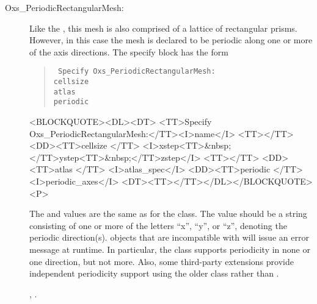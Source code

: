\begin{description}
\item[Oxs\_PeriodicRectangularMesh:]
\label{HTMLoxsperiodicrectangularmesh}%
%
Like the , this mesh is also comprised of a
lattice of rectangular prisms.  However, in this case the
mesh is declared to be periodic along one or more of the axis
directions.  The specify block has the form
\begin{latexonly}
\begin{quote}\tt
Specify Oxs\_PeriodicRectangularMesh: \ocb \\
\bi cellsize \ocb{}\ccb\\
\bi atlas \\
\bi periodic \\
\ccb
\end{quote}
\end{latexonly}
\begin{rawhtml}
<BLOCKQUOTE><DL><DT>
<TT>Specify Oxs_PeriodicRectangularMesh:</TT><I>name</I> <TT>{</TT>
<DD><TT>cellsize {</TT>
  <I>xstep<TT>&nbsp;</TT>ystep<TT>&nbsp;</TT>zstep</I>
  <TT>}</TT>
<DD><TT>atlas </TT> <I>atlas_spec</I>
<DD><TT>periodic </TT> <I>periodic_axes</I>
<DT><TT>}</TT></DL></BLOCKQUOTE><P>
\end{rawhtml}
The  and  values are the same as
for the  class.  The 
value should be a string consisting of one or more of the letters
``x'', ``y'', or ``z'', denoting the periodic direction(s).
 objects that are incompatible with
 will issue an error message at
runtime.  In particular, the
 class supports
periodicity in none or one direction, but not more.  Also, some
third-party extensions provide independent periodicity support using
the older  class rather than
.

\begin{ExampleMifs}
 , .
\end{ExampleMifs}

\end{description}

